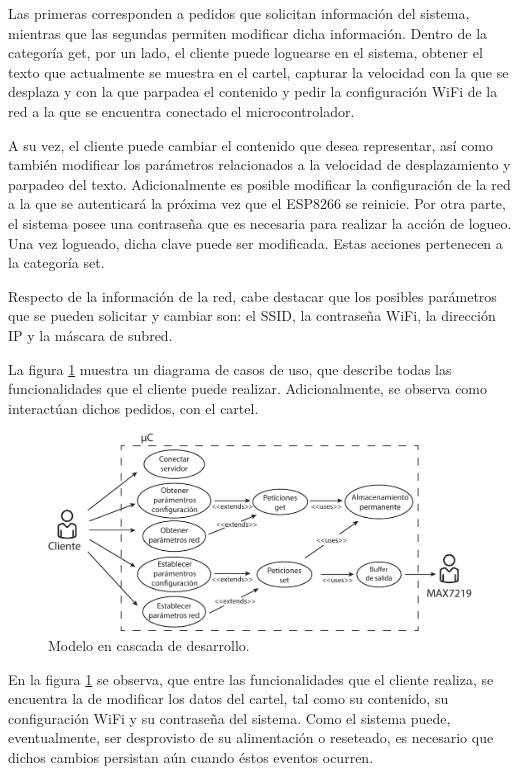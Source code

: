 Las primeras corresponden a pedidos que solicitan información del sistema, mientras que las segundas permiten modificar dicha información.
Dentro de la categoría get, por un lado, el cliente puede loguearse en el sistema, obtener el texto que actualmente se muestra en el cartel, capturar la velocidad con la que se desplaza y con la que parpadea el contenido y pedir la configuración WiFi de la red a la que se encuentra conectado el microcontrolador.

A su vez, el cliente puede cambiar el contenido que desea representar, así como también modificar los parámetros relacionados a la velocidad de desplazamiento y parpadeo del texto.
Adicionalmente es posible modificar la configuración de la red a la que se autenticará la próxima vez que el ESP8266 se reinicie.
Por otra parte, el sistema posee una contraseña que es necesaria para realizar la acción de logueo.
Una vez logueado, dicha clave puede ser modificada. Estas acciones pertenecen a la categoría set.

Respecto de la información de la red, cabe destacar que los posibles parámetros que se pueden solicitar y cambiar son: el SSID, la contraseña WiFi, la dirección IP y la máscara de subred.

La figura \ref{fig:diagrama_casos_de_uso} muestra un diagrama de casos de uso, que describe todas las funcionalidades que el cliente puede realizar.
Adicionalmente, se observa como interactúan dichos pedidos, con el cartel.

\begin{figure}[!ht]
	\centering
	\includegraphics[width=0.8\linewidth]{imagenes/sistema-caso-de-uso.pdf}
	\caption{Modelo en cascada de desarrollo.}
	\label{fig:diagrama_casos_de_uso}
\end{figure}

En la figura \ref{fig:diagrama_casos_de_uso} se observa, que entre las funcionalidades que el cliente realiza, se encuentra la de modificar los datos del cartel, tal como su contenido, su configuración WiFi y su contraseña del sistema.
Como el sistema puede, eventualmente, ser desprovisto de su alimentación o reseteado, es necesario que dichos cambios persistan aún cuando éstos eventos ocurren.

